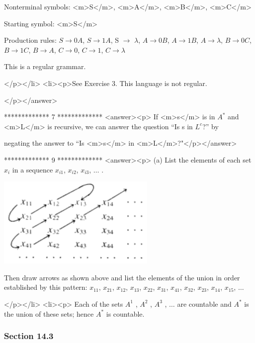 Nonterminal symbols: <m>S</m>, <m>A</m>, <m>B</m>, <m>C</m> 



Starting symbol: <m>S</m>



Production rules: \(S \to  0A\), \(S \to  1A\), S $\to $ $\lambda $, \(A \to  0B\), \(A \to  1B\), \(A \to  \lambda\), \(B \to  0C\), \(B \to  1C\),
\(B \to  A\), \(C \to  0\), \(C \to  1\), \(C \to  \lambda\) 



 This is a regular grammar.



   </p></li>
<li><p>See Exercise 3. This language is not regular.

</p></answer>


*************
7
*************
<answer><p> If <m>s</m> is in \(A^*\) and <m>L</m> is recursive, we can answer the question {``}Is s in \(L^c\)?{''}  by



negating the answer to {``}Is <m>s</m> in <m>L</m>?$\texttt{"}$</p></answer>


*************
9
*************
<answer><p> (a) List the elements of each set \(x_i\)  in a sequence \(x_{i 1}\), \(x_{i 2}\), \(x_{i 3}\), $\ldots $ .   

\includegraphics{Sol_9-16_gr2.eps}



Then draw arrows as shown above and list the elements of the union in order established by this pattern:  \(x_{11}\), \(x_{21}\), \(x_{12}\), \(x_{13}\),
\(x_{22}\), \(x_{31}\), \(x_{41}\), \(x_{32}\), \(x_{23}\), \(x_{14}\), \(x_{15}\), $\ldots $

</p></li>
<li><p>  Each of the sets \(A^1\) , \(A^2\) , \(A^3\) , $\ldots $ are countable and \(A^*\) is the union of these sets; hence \(A^*\) is countable.


\subsubsection{Section 14.3}



